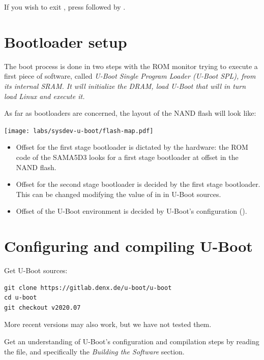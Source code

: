 If you wish to exit , press \code{[Ctrl][a]} followed by
\code{[Ctrl][x]}.

\section{Bootloader setup}

The boot process is done in two steps with the ROM monitor trying to
execute a first piece of software, called \em{U-Boot Single Program
Loader (U-Boot SPL)}, from its internal SRAM. It will initialize the
DRAM, load \em{U-Boot} that will in turn load Linux and execute it.

As far as bootloaders are concerned, the layout of the NAND flash will
look like:

\begin{center}
  \texttt{[image: labs/sysdev-u-boot/flash-map.pdf]}
\end{center}

\begin{itemize}
\item Offset  for the first stage bootloader is dictated by
  the hardware: the ROM code of the SAMA5D3 looks for a first stage
  bootloader at offset  in the NAND flash.
\item Offset  for the second stage bootloader is decided
  by the first stage bootloader. This can be changed modifying the
  value of  in
   in U-Boot
  sources.
\item Offset  of the U-Boot environment is decided by
  U-Boot's configuration ().
\end{itemize}

\section{Configuring and compiling U-Boot}

Get U-Boot sources:

\begin{verbatim}
git clone https://gitlab.denx.de/u-boot/u-boot
cd u-boot
git checkout v2020.07
\end{verbatim}

More recent versions may also work, but we have not tested them.

Get an understanding of U-Boot's
configuration and compilation steps by reading the  file,
and specifically the {\em Building the Software} section.

